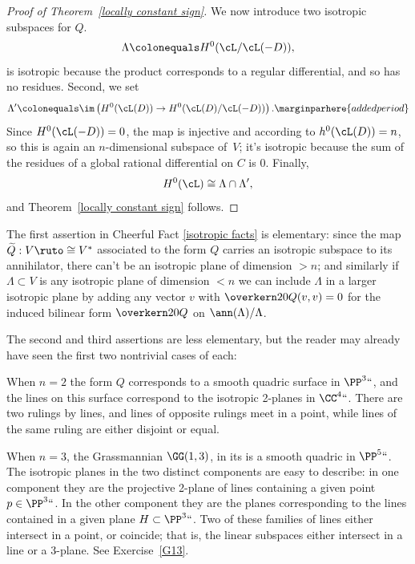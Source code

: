 \begin{proof}[Proof of Theorem~\ref{locally constant sign}]
We now introduce two isotropic subspaces for $Q$.
$$
\Lambda \colonequals  H^0( \cL / \cL(-D) ),
$$
is isotropic because the product
corresponds to a regular differential, and so has no residues.
Second, we set
$$
\Lambda' \colonequals  \im\left( H^0(\cL(D)) \to H^0( \cL(D) / \cL(-D) ) \right)
.
\marginparhere{added period}
$$
Since  $H^0(\cL(-D)) = 0$, the map is injective and according to
$h^0(\cL(D)) = n$, so this is again an $n$-dimensional
subspace of~$V$; it's isotropic because the sum of the residues of a
global rational differential on $C$ is 0. Finally,
$$
H^0(\cL) \cong \Lambda \cap \Lambda',
$$
and Theorem~\ref{locally constant sign} follows.
\end{proof}

\begin{remark}
The first assertion in
Cheerful Fact \ref{isotropic facts}
is
elementary: since the map
$\widetilde Q : V \ruto \cong V^*$ associated to the form $Q$ carries
%
an isotropic subspace to its annihilator, there can't be an isotropic
plane of dimension $>n$; and similarly if $\Lambda \subset V$ is any
isotropic plane of dimension $<n$ we can include $\Lambda$ in a larger
isotropic plane by adding any vector $v$ with $\overkern20 Q(v,v) = 0$
for the induced bilinear form $\overkern20 Q$ on $\ann(\Lambda)/\Lambda$.

The second and third assertions are less elementary, but the reader may
already have seen the first two nontrivial cases of each:
\end{remark}

\begin{example}
When $n=2$ the form $Q$ corresponds to a smooth quadric surface
in $\PP^3` `$, and the lines on this surface correspond to the isotropic
2-planes in $\CC^4` `$. There are two rulings by lines, and lines of
opposite rulings meet in a point, while lines of the same ruling are
either disjoint or equal.
\end{example}
\begin{example}
When $n=3$, the Grassmannian $\GG(1,3)$, in its
%
%
is a smooth quadric in $\PP^5` `$. The isotropic planes in the two distinct
components are easy to describe: in one component they are the projective
2-plane of lines containing a given point $p \in \PP^3` `$. In the other
component they are  the planes corresponding to the lines contained in a
given plane $H \subset \PP^3` `$. Two of these families of lines either
intersect
in a point, or coincide; that is, the linear subspaces either
intersect  in a line or a 3-plane. See Exercise~\ref{G13}.
\end{example}

